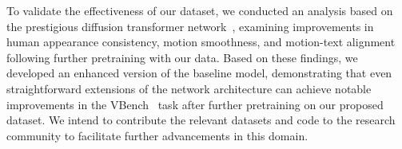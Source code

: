To validate the effectiveness of our dataset, we conducted an analysis based on the prestigious diffusion transformer network~\cite{yang2024cogvideox}, examining improvements in human appearance consistency, motion smoothness, and motion-text alignment following further pretraining with our data. 
Based on these findings, we developed an enhanced version of the baseline model, demonstrating that even straightforward extensions of the network architecture can achieve notable improvements in the VBench~\cite{huang2024vbench} task after further pretraining on our proposed dataset. 
We intend to contribute the relevant datasets and code to the research community to facilitate further advancements in this domain.